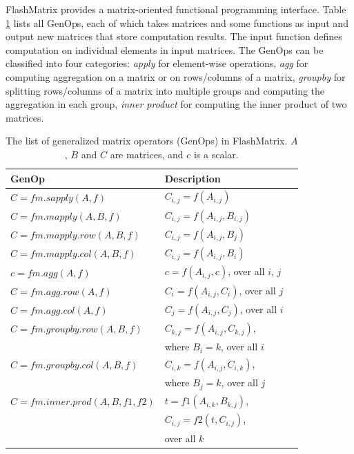 FlashMatrix provides a matrix-oriented functional programming interface.
Table \ref{tbl:genops} lists all GenOps, each of which takes matrices and
some functions as input and output new matrices that store computation results.
The input function defines computation on individual elements in input matrices.
The GenOps can be classified into four categories: \textit{apply} for
element-wise operations, \textit{agg} for computing aggregation on a matrix
or on rows/columns of a matrix, \textit{groupby} for splitting rows/columns
of a matrix into multiple groups and computing the aggregation in each group,
\textit{inner product} for computing the inner product of two matrices.

\begin{table}
\begin{center}
\footnotesize
\begin{tabular}{|l|l|l|}
\hline
GenOp & Description \\
\hline
$C=fm.sapply(A, f)$ & $C_{i,j}=f(A_{i,j})$ \\
\hline
$C=fm.mapply(A, B, f)$ & $C_{i,j}=f(A_{i,j}, B_{i,j})$ \\
\hline
$C=fm.mapply.row(A, B, f)$ & $C_{i,j}=f(A_{i,j}, B_j)$ \\
\hline
$C=fm.mapply.col(A, B, f)$ & $C_{i,j}=f(A_{i,j}, B_i)$ \\
\hline
$c=fm.agg(A, f)$ & $c=f(A_{i,j}, c)$, over all $i$, $j$ \\
\hline
$C=fm.agg.row(A, f)$ & $C_i=f(A_{i,j}, C_i)$, over all $j$ \\
\hline
$C=fm.agg.col(A, f)$ & $C_j=f(A_{i,j}, C_j)$, over all $i$ \\
\hline
$C=fm.groupby.row(A, B, f)$ & $C_{k,j}=f(A_{i,j}, C_{k,j})$,\\ & where $B_i=k$, over all $i$ \\
\hline
$C=fm.groupby.col(A, B, f)$ & $C_{i,k}=f(A_{i,j}, C_{i,k})$,\\ & where $B_j=k$, over all $j$ \\
\hline
$C=fm.inner.prod(A, B, f1, f2)$ & $t=f1(A_{i,k}, B_{k,j})$,
\\ & $C_{i,j}=f2(t, C_{i,j})$,
\\ & over all $k$ \\
\hline
\end{tabular}
\normalsize
\end{center}
\caption{The list of generalized matrix operators (GenOps) in FlashMatrix.
$A$, $B$ and $C$ are matrices, and $c$ is a scalar.}
\label{tbl:genops}
\end{table}

